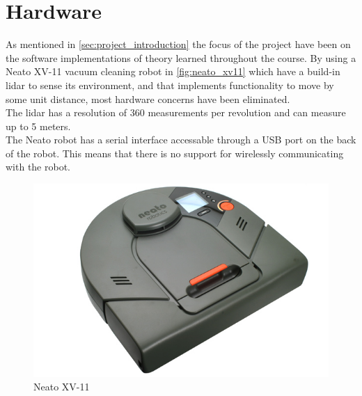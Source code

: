 
\section{Hardware} %
\label{sec:hardware}

As mentioned in \autoref{sec:project_introduction} the focus of the project have been on the software implementations of theory learned throughout the course.
By using a Neato XV-11 vacuum cleaning robot in \autoref{fig:neato_xv11} which have a build-in lidar to sense its environment, and that implements functionality to move by some unit distance, most hardware concerns have been eliminated.\\
The lidar has a resolution of 360 measurements per revolution and can measure up to 5 meters.\\

The Neato robot has a serial interface accessable through a USB port on the back of the robot.
This means that there is no support for wirelessly communicating with the robot.

\begin{figure}[H]
\centering
\includegraphics[scale=0.40]{images/neato_xv11}
\caption{Neato XV-11}
\label{fig:neato_xv11}
\end{figure}



